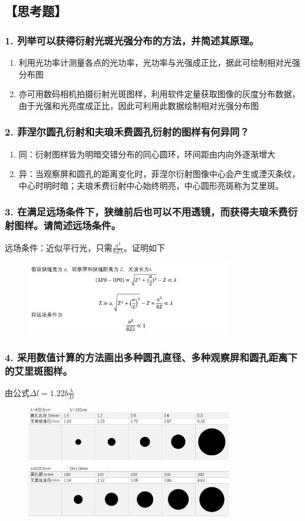 \documentclass[12pt,a4paper,UTF8]{ctexart}
\begin{document}
\subsection*{【思考题】}
\subsubsection*{1. 列举可以获得衍射光斑光强分布的方法，并简述其原理。}
\begin{enumerate}[label=\arabic*.]
	\item 利用光功率计测量各点的光功率，光功率与光强成正比，据此可绘制相对光强分布图
	\item 亦可用数码相机拍摄衍射光斑图样，利用软件定量获取图像的灰度分布数据，由于光强和光亮度成正比，因此可利用此数据绘制相对光强分布图
\end{enumerate}
\subsubsection*{2. 菲涅尔圆孔衍射和夫琅禾费圆孔衍射的图样有何异同？}
\begin{enumerate}[label=\arabic*.]
	\item 同：衍射图样皆为明暗交错分布的同心圆环，环间距由内向外逐渐增大
	\item 异：当观察屏和圆孔的距离变化时，菲涅尔衍射图像中心会产生或湮灭条纹，中心时明时暗；夫琅禾费衍射中心始终明亮，中心圆形亮斑称为艾里斑。
\end{enumerate}
\subsubsection*{3. 在满足远场条件下，狭缝前后也可以不用透镜，而获得夫琅禾费衍射图样。请简述远场条件。}
远场条件：近似平行光，只需$\frac{a^2}{8Z\lambda}$。证明如下
\begin{figure}[htbp]
	\centering
	\includegraphics[width=0.8\textwidth]{attachments//illus-2.1.png}
\end{figure}
\subsubsection*{4. 采用数值计算的方法画出多种圆孔直径、多种观察屏和圆孔距离下的艾里斑图样。}
由公式$\Delta l = 1.22b\frac{\lambda}{D}$
\begin{figure}[htbp]
	\centering
	\includegraphics[width=0.8\textwidth]{attachments//illus-2.2.png}
\end{figure}
\end{document}
